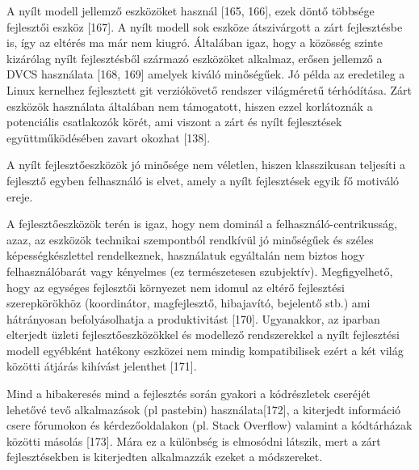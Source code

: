 \documentclass[12pt,magyar,a4paper,oneside]{scrreprt}
\begin{document}
A nyílt modell jellemző eszközöket használ {[}165, 166{]}, ezek döntő
többsége fejlesztői eszköz {[}167{]}. A nyílt modell sok eszköze
átszivárgott a zárt fejlesztésbe is, így az eltérés ma már nem kiugró.
Általában igaz, hogy a közösség szinte kizárólag nyílt fejlesztésből
származó eszközöket alkalmaz, erősen jellemző a DVCS használata {[}168,
169{]} amelyek kiváló minőségűek. Jó példa az eredetileg a Linux
kernelhez fejlesztett git verziókövető rendszer világméretű térhódítása.
Zárt eszközök használata általában nem támogatott, hiszen ezzel
korlátoznák a potenciális csatlakozók körét, ami viszont a zárt és nyílt
fejlesztések együttműködésében zavart okozhat {[}138{]}.

A nyílt fejlesztőeszközök jó minősége nem véletlen, hiszen klasszikusan
teljesíti a fejlesztő egyben felhasználó is elvet, amely a nyílt
fejlesztések egyik fő motiváló ereje.

A fejlesztőeszközök terén is igaz, hogy nem dominál a
felhasználó-centrikusság, azaz, az eszközök technikai szempontból
rendkívül jó minőségűek és széles képességkészlettel rendelkeznek,
használatuk egyáltalán nem biztos hogy felhasználóbarát vagy kényelmes
(ez természetesen szubjektív). Megfigyelhető, hogy az egységes
fejlesztői környezet nem idomul az eltérő fejlesztési szerepkörökhöz
(koordinátor, magfejlesztő, hibajavító, bejelentő stb.) ami hátrányosan
befolyásolhatja a produktivitást {[}170{]}. Ugyanakkor, az iparban
elterjedt üzleti fejlesztőeszközökkel és modellező rendszerekkel a nyílt
fejlesztési modell egyébként hatékony eszközei nem mindig kompatibilisek
ezért a két világ közötti átjárás kihívást jelenthet {[}171{]}.

Mind a hibakeresés mind a fejlesztés során gyakori a kódrészletek
cseréjét lehetővé tevő alkalmazások (pl pastebin) használata{[}172{]}, a
kiterjedt információ csere fórumokon és kérdezőoldalakon (pl. Stack
Overflow) valamint a kódtárházak közötti másolás {[}173{]}. Mára ez a
különbség is elmosódni látszik, mert a zárt fejlesztésekben is
kiterjedten alkalmazzák ezeket a módszereket.
\end{document}
